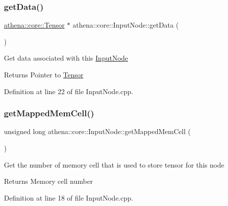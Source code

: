 \subsubsection{\texorpdfstring{get\+Data()}{getData()}}
{\footnotesize\ttfamily \mbox{\hyperlink{classathena_1_1core_1_1_tensor}{athena\+::core\+::\+Tensor}} $\ast$ athena\+::core\+::\+Input\+Node\+::get\+Data (\begin{DoxyParamCaption}{ }\end{DoxyParamCaption})}

Get data associated with this \mbox{\hyperlink{classathena_1_1core_1_1_input_node}{Input\+Node}} \begin{DoxyReturn}{Returns}
Pointer to \mbox{\hyperlink{classathena_1_1core_1_1_tensor}{Tensor}} 
\end{DoxyReturn}


Definition at line 22 of file Input\+Node.\+cpp.

\mbox{\label{classathena_1_1core_1_1_input_node_acebc0cbf077eaae99f5c11cfba608533}} 
\subsubsection{\texorpdfstring{get\+Mapped\+Mem\+Cell()}{getMappedMemCell()}}
{\footnotesize\ttfamily unsigned long athena\+::core\+::\+Input\+Node\+::get\+Mapped\+Mem\+Cell (\begin{DoxyParamCaption}{ }\end{DoxyParamCaption})}

Get the number of memory cell that is used to store tensor for this node \begin{DoxyReturn}{Returns}
Memory cell number 
\end{DoxyReturn}


Definition at line 18 of file Input\+Node.\+cpp.

\mbox{\label{classathena_1_1core_1_1_input_node_a4be7482bcf2e56ea3fd03a2bf79be074}} 
